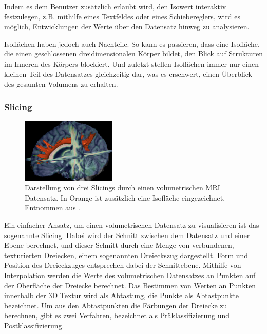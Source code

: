 \documentclass[a4paper,fontsize=12pt,toc=bib,parskip=half,ngerman]{scrartcl}
\begin{document}
Indem es dem Benutzer zus\"atzlich erlaubt wird, den Isowert interaktiv festzulegen, z.B. mithilfe eines Textfeldes oder eines Schiebereglers, wird es m\"oglich, Entwicklungen der Werte \"uber den Datensatz hinweg zu analysieren.

Isofl\"achen haben jedoch auch Nachteile. So kann es passieren, dass eine Isofl\"ache, die einen geschlossenen dreidimensionalen K\"orper bildet, den Blick auf Strukturen im Inneren des K\"orpers blockiert. Und zuletzt stellen Isofl\"achen immer nur einen kleinen Teil des Datensatzes gleichzeitig dar, was es erschwert, einen \"Uberblick des gesamten Volumens zu erhalten.

\subsubsection{Slicing}

\begin{figure}
		\centering
		\includegraphics[width=0.4\textwidth]{pictures/slicing.png}
		\caption{Darstellung von drei Slicings durch einen volumetrischen MRI Datensatz. In Orange ist zus\"atzlich eine Isofl\"ache eingezeichnet. Entnommen aus \cite{vis15}.}
		\label{Slicing}
\end{figure}


\label{sec:Slicing}
Ein einfacher Ansatz, um einen volumetrischen Datensatz zu visualisieren ist das sogenannte \glq Slicing\grq{}\cite{munzner2014visualization}. Dabei wird der Schnitt zwischen dem Datensatz und einer Ebene berechnet, und dieser Schnitt durch eine Menge von verbundenen, texturierten Dreiecken, einem sogenannten \glq Dreieckszug\grq{} dargestellt. Form und Position des Dreieckzuges entsprechen dabei der Schnittebene. Mithilfe von Interpolation werden die Werte des volumetrischen Datensatzes an Punkten auf der Oberfl\"ache der Dreiecke berechnet. Das Bestimmen von Werten an Punkten innerhalb der 3D Textur wird als \glq Abtastung\grq{}, die Punkte als \glq Abtastpunkte\grq{} bezeichnet. Um aus den Abtastpunkten die F\"arbungen der Dreiecke zu berechnen, gibt es zwei Verfahren, bezeichnet als Pr\"aklassifizierung und Postklassifizierung.
\end{document}
